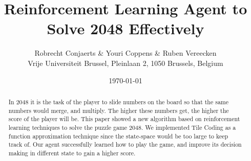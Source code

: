 \documentclass[a4paper,12pt]{article}
\begin{document}
\title{Reinforcement Learning Agent to Solve 2048 Effectively}
\author{
Robrecht Conjaerts \& Youri Coppens \& Ruben Vereecken \\
Vrije Universiteit Brussel, Pleinlaan 2, 1050 Brussels, Belgium \\
}
\date{\today}
\maketitle

\begin{abstract}
In $2048$ it is the task of the player to slide numbers on the board so that the same numbers would merge, and multiply. The higher these numbers get, the higher the score of the player will be. This paper showed a new algorithm based on reinforcement learning techniques to solve the puzzle game $2048$. We implemented Tile Coding as a function approximation technique since the state-space would be too large to keep track of. Our agent successfully learned how to play the game, and improve its decision making in different state to gain a higher score.
\end{abstract}
\end{document}
